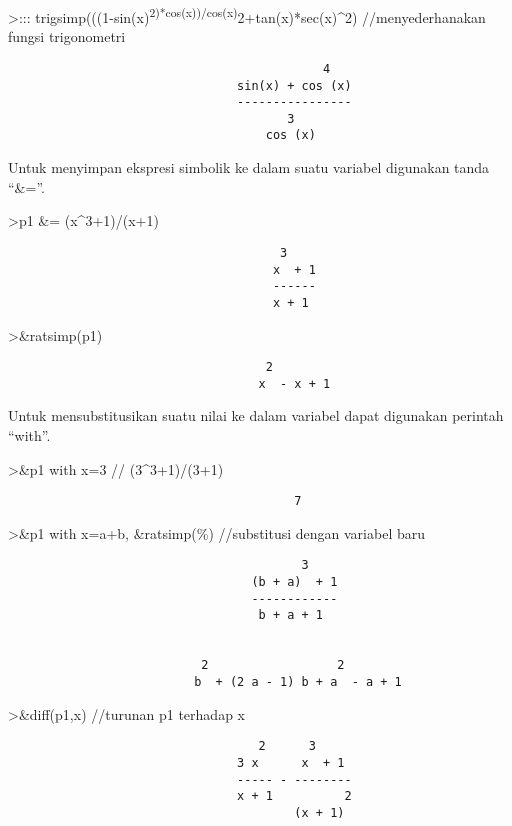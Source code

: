 \documentclass[
]{book}
\begin{document}
\textgreater::: trigsimp(((1-sin(x)\textsuperscript{2)*cos(x))/cos(x)}2+tan(x)*sec(x)\^{}2) //menyederhanakan fungsi trigonometri

\begin{verbatim}
                                            4
                                sin(x) + cos (x)
                                ----------------
                                       3
                                    cos (x)
\end{verbatim}

Untuk menyimpan ekspresi simbolik ke dalam suatu variabel digunakan tanda ``\&=''.

\textgreater p1 \&= (x\^{}3+1)/(x+1)

\begin{verbatim}
                                      3
                                     x  + 1
                                     ------
                                     x + 1
\end{verbatim}

\textgreater\&ratsimp(p1)

\begin{verbatim}
                                    2
                                   x  - x + 1
\end{verbatim}

Untuk mensubstitusikan suatu nilai ke dalam variabel dapat digunakan perintah ``with''.

\textgreater\&p1 with x=3 // (3\^{}3+1)/(3+1)

\begin{verbatim}
                                        7
\end{verbatim}

\textgreater\&p1 with x=a+b, \&ratsimp(\%) //substitusi dengan variabel baru

\begin{verbatim}
                                         3
                                  (b + a)  + 1
                                  ------------
                                   b + a + 1


                           2                  2
                          b  + (2 a - 1) b + a  - a + 1
\end{verbatim}

\textgreater\&diff(p1,x) //turunan p1 terhadap x

\begin{verbatim}
                                   2      3
                                3 x      x  + 1
                                ----- - --------
                                x + 1          2
                                        (x + 1)
\end{verbatim}
\end{document}
